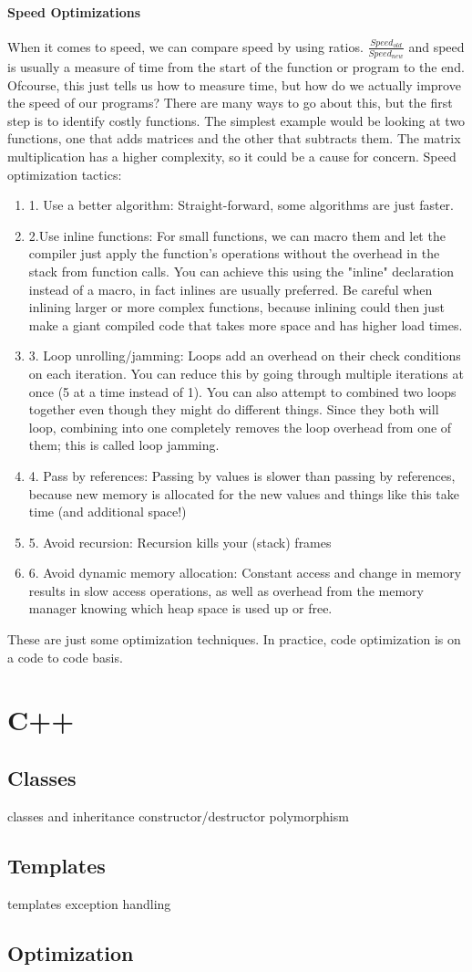 \paragraph{Speed Optimizations} When it comes to speed, we can compare speed by using ratios. $\frac{Speed_{old}}{Speed_{new}}$ and speed is usually a measure of time from the start of the function or program to the end. Ofcourse, this just tells us how to measure time, but how do we actually improve the speed of our programs? There are many ways to go about this, but the first step is to identify costly functions. The simplest example would be looking at two functions, one that adds matrices and the other that subtracts them. The matrix multiplication has a higher complexity, so it could be a cause for concern.\newline
Speed optimization tactics:
\begin{enumerate}
	\item 1. Use a better algorithm: Straight-forward, some algorithms are just faster.
	\item 2.Use inline functions: For small functions, we can macro them and let the compiler just apply the function's operations without the overhead in the stack from function calls. You can achieve this using the "inline" declaration instead of a macro, in fact inlines are usually preferred. Be careful when inlining larger or more complex functions, because inlining could then just make a giant compiled code that takes more space and has higher load times.
	\item 3. Loop unrolling/jamming: Loops add an overhead on their check conditions on each iteration. You can reduce this by going through multiple iterations at once (5 at a time instead of 1). You can also attempt to combined two loops together even though they might do different things. Since they both will loop, combining into one completely removes the loop overhead from one of them; this is called loop jamming.
	\item 4. Pass by references: Passing by values is slower than passing by references, because new memory is allocated for the new values and things like this take time (and additional space!)
	\item 5. Avoid recursion: Recursion kills your (stack) frames
	\item 6. Avoid dynamic memory allocation: Constant access and change in memory results in slow access operations, as well as overhead from the memory manager knowing which heap space is used up or free.
\end{enumerate}
These are just some optimization techniques. In practice, code optimization is on a code to code basis.

\section{C++}
\subsection{Classes}
classes and inheritance
constructor/destructor
polymorphism
\subsection{Templates}
templates
exception handling
\subsection{Optimization}
